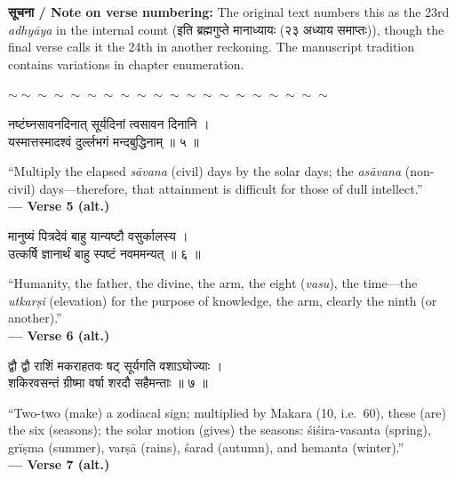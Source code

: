\documentclass[11pt,a4paper]{article}
\newcommand{\dev}[1]{{\devanagarifont #1}}
\newenvironment{bilingualverse}{%
  \begin{paracol}{2}
  \fontsize{10.5}{13}\selectfont
}{%
  \end{paracol}
  \vspace{0.3cm}
}
\newcommand{\wavydivider}{\begin{center}$\sim\sim\sim\sim\sim\sim\sim\sim\sim\sim\sim\sim\sim\sim\sim\sim\sim\sim\sim\sim$\end{center}}
\newenvironment{paracol}[1]{\begingroup}{\endgroup}
\newenvironment{leftcolumn*}{\begingroup}{\endgroup}
\newenvironment{rightcolumn}{\begingroup}{\endgroup}
\begin{document}
\vspace{0.3cm}

\textbf{\dev{सूचना} / Note on verse numbering:} The original text numbers this as the 23rd \textit{adhyāya} in the internal count (\dev{इति ब्रह्मगुप्ते मानाध्यायः (२३ अध्याय समाप्तः)}), though the final verse calls it the 24th in another reckoning. The manuscript tradition contains variations in chapter enumeration.

\wavydivider

\begin{bilingualverse}
\begin{leftcolumn*}
\dev{नष्टंघ्नसावनदिनात् सूर्यदिनां त्वसावन दिनानि ।}\\
\dev{यस्मात्तस्मादश्वं दुर्ल्लभगं मन्दबुद्धिनाम् ॥ ५ ॥}
\end{leftcolumn*}
\begin{rightcolumn}
``Multiply the elapsed \textit{sāvana} (civil) days by the solar days; the \textit{asāvana} (non-civil) days---therefore, that attainment is difficult for those of dull intellect.''\\[0.3cm]
\hfill\textbf{— Verse 5 (alt.)}
\end{rightcolumn}
\end{bilingualverse}

\begin{bilingualverse}
\begin{leftcolumn*}
\dev{मानुष्यं पित्रदेवं बाहु यान्यष्टौ वसुर्कालस्य ।}\\
\dev{उत्कर्षि ज्ञानार्थं बाहु स्पष्टं नवममन्यत् ॥ ६ ॥}
\end{leftcolumn*}
\begin{rightcolumn}
``Humanity, the father, the divine, the arm, the eight (\textit{vasu}), the time---the \textit{utkarṣi} (elevation) for the purpose of knowledge, the arm, clearly the ninth (or another).''\\[0.3cm]
\hfill\textbf{— Verse 6 (alt.)}
\end{rightcolumn}
\end{bilingualverse}

\begin{bilingualverse}
\begin{leftcolumn*}
\dev{द्वौ द्वौ राशिं मकराहतवः षट् सूर्यगति वशाऽघोज्याः ।}\\
\dev{शकिरवसन्तं ग्रीष्मा वर्षा शरदौ सहैमन्ताः ॥ ७ ॥}
\end{leftcolumn*}
\begin{rightcolumn}
``Two-two (make) a zodiacal sign; multiplied by Makara (10, i.e.\ 60), these (are) the six (seasons); the solar motion (gives) the seasons: śiśira-vasanta (spring), grīṣma (summer), varṣā (rains), śarad (autumn), and hemanta (winter).''\\[0.3cm]
\hfill\textbf{— Verse 7 (alt.)}
\end{rightcolumn}
\end{bilingualverse}
\end{document}
